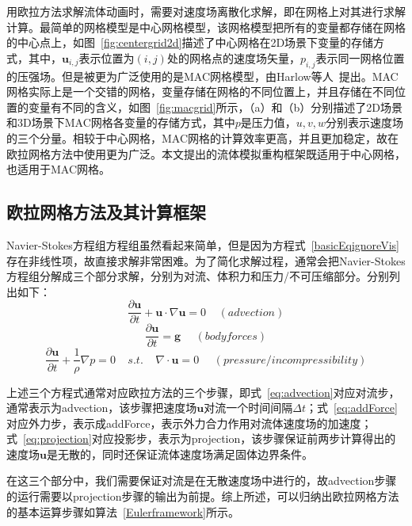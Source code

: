 用欧拉方法求解流体动画时，需要对速度场离散化求解，即在网格上对其进行求解计算。最简单的网格模型是中心网格模型，该网格模型把所有的变量都存储在网格的中心点上，如图~\ref{fig:centergrid2d}描述了中心网格在2D场景下变量的存储方式，其中，$\boldsymbol u_{i,j}$表示位置为$(i,j)$处的网格点的速度场矢量，$p_{i,j}$表示同一网格位置的压强场。但是被更为广泛使用的是MAC网格模型，由Harlow等人~\cite{harlow1965numerical}提出。MAC网格实际上是一个交错的网格，变量存储在网格的不同位置上，并且存储在不同位置的变量有不同的含义，如图~\ref{fig:macgrid}所示，（a）和（b）分别描述了2D场景和3D场景下MAC网格各变量的存储方式，其中\(p\)是压力值，\(u,v,w\)分别表示速度场的三个分量。相较于中心网格，MAC网格的计算效率更高，并且更加稳定，故在欧拉网格方法中使用更为广泛。本文提出的流体模拟重构框架既适用于中心网格，也适用于MAC网格。

\subsection{欧拉网格方法及其计算框架}

Navier-Stokes方程组方程组虽然看起来简单，但是因为方程式~\ref{basicEqignoreVis}存在非线性项，故直接求解非常困难。为了简化求解过程，通常会把Navier-Stokes方程组分解成三个部分求解，分别为对流、体积力和压力/不可压缩部分。分别列出如下：
\begin{equation}
\label{eq:advection}
\frac{\partial {\boldsymbol u}}{\partial t} + {\boldsymbol u} \cdot \nabla {\boldsymbol u} = 0  \ \ \ \ \ (advection)
\end{equation}
\begin{equation}
\label{eq:addForce}
\frac{\partial {\boldsymbol u}}{\partial t} = {\boldsymbol g}  \ \ \ \ \ \ (body forces)
\end{equation}
\begin{equation}
\label{eq:projection}
\frac{\partial {\boldsymbol u}}{\partial t} + \frac{1}{\rho} \nabla p= 0 
\ \ \ \ \ 
 s.t. \ \ \ \ \ 
 \nabla \cdot {\boldsymbol u} = 0 \ \ \ \ \ \ (pressure/incompressibility)
\end{equation}

上述三个方程式通常对应欧拉方法的三个步骤，即式~\ref{eq:advection}对应对流步，通常表示为advection，该步骤把速度场\({\boldsymbol u}\)对流一个时间间隔\(\Delta t\)；式~\ref{eq:addForce}对应外力步，表示成addForce，表示外力合力作用对流体速度场的加速度；式~\ref{eq:projection}对应投影步，表示为projection，该步骤保证前两步计算得出的速度场\({\boldsymbol u}\)是无散的，同时还保证流体速度场满足固体边界条件。

在这三个部分中，我们需要保证对流是在无散速度场中进行的，故advection步骤的运行需要以projection步骤的输出为前提。综上所述，可以归纳出欧拉网格方法的基本运算步骤如算法~\ref{Eulerframework}所示。

